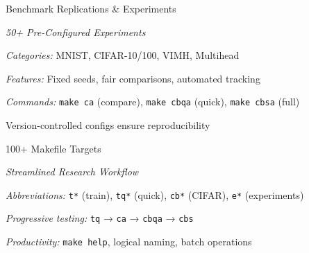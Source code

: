 \begin{slide}[\slideopts,toc={Benchmarks}]{Benchmark Replications \& Experiments}
  
  \emph{50+ Pre-Configured Experiments}
  
  \begin{itemize}
    \mpitem \emph{Categories:} MNIST, CIFAR-10/100, VIMH, Multihead
    
    \mpitem \emph{Features:} Fixed seeds, fair comparisons, automated tracking
    
    \mpitem \emph{Commands:} \texttt{make ca} (compare), \texttt{make cbqa} (quick), \texttt{make cbsa} (full)
    
    \mpitem Version-controlled configs ensure reproducibility
  \end{itemize}
\end{slide}

\begin{slide}[\slideopts,toc={Makefile}]{100+ Makefile Targets}
  
  \emph{Streamlined Research Workflow}
  
  \begin{itemize}
    \mpitem \emph{Abbreviations:} \texttt{t*} (train), \texttt{tq*} (quick), \texttt{cb*} (CIFAR), \texttt{e*} (experiments)
    
    \mpitem \emph{Progressive testing:} \texttt{tq} → \texttt{ca} → \texttt{cbqa} → \texttt{cbs}
    
    \mpitem \emph{Productivity:} \texttt{make help}, logical naming, batch operations
  \end{itemize}
\end{slide}


